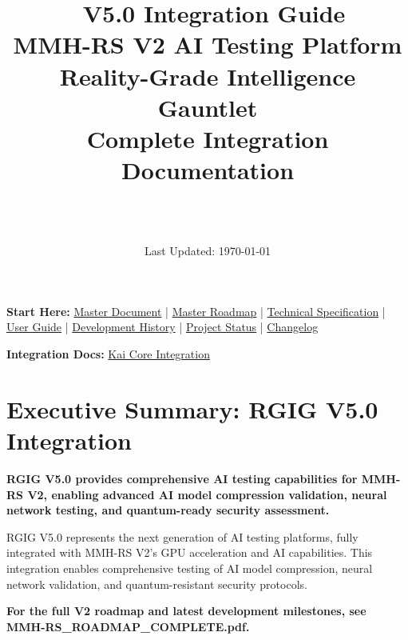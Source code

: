 \documentclass[12pt,a4paper]{article}
\title{\Huge\textbf{\project\ V5.0 Integration Guide}\\[0.5cm]
\Large\textbf{MMH-RS V2 AI Testing Platform}\\[0.3cm]
\large Reality-Grade Intelligence Gauntlet\\[0.5cm]
\large Complete Integration Documentation}
\author{\Large\authorname\\[0.2cm]\email\\[0.2cm]\github}
\date{\large Last Updated: \today}
\begin{document}
\maketitle
\thispagestyle{empty}

\begin{tcolorbox}[colback=blue!10,colframe=blue!50,title=\textbf{Full Documentation Suite}]
\textbf{Start Here:} \href{MMH-RS_MASTER_DOCUMENT.pdf}{Master Document} | \href{MMH-RS_ROADMAP_COMPLETE.pdf}{Master Roadmap} | \href{MMH-RS_TECHNICAL_COMPLETE.pdf}{Technical Specification} | \href{USER_GUIDE.md}{User Guide} | \href{DEVELOPMENT_HISTORY.md}{Development History} | \href{PROJECT_STATUS.md}{Project Status} | \href{CHANGELOG.md}{Changelog}

\textbf{Integration Docs:} \href{KAI_CORE_INTEGRATION_COMPLETE.pdf}{Kai Core Integration}
\end{tcolorbox}

\tableofcontents
\newpage

\section{Executive Summary: RGIG V5.0 Integration}

\begin{tcolorbox}[colback=v2blue!10,colframe=v2blue!50,title=\textbf{RGIG V5.0 Integration Summary}]
\textbf{RGIG V5.0 provides comprehensive AI testing capabilities for MMH-RS V2, enabling advanced AI model compression validation, neural network testing, and quantum-ready security assessment.}

RGIG V5.0 represents the next generation of AI testing platforms, fully integrated with MMH-RS V2's GPU acceleration and AI capabilities. This integration enables comprehensive testing of AI model compression, neural network validation, and quantum-resistant security protocols.
\end{tcolorbox}

\textbf{For the full V2 roadmap and latest development milestones, see MMH-RS\_ROADMAP\_COMPLETE.pdf.}
\end{document}
